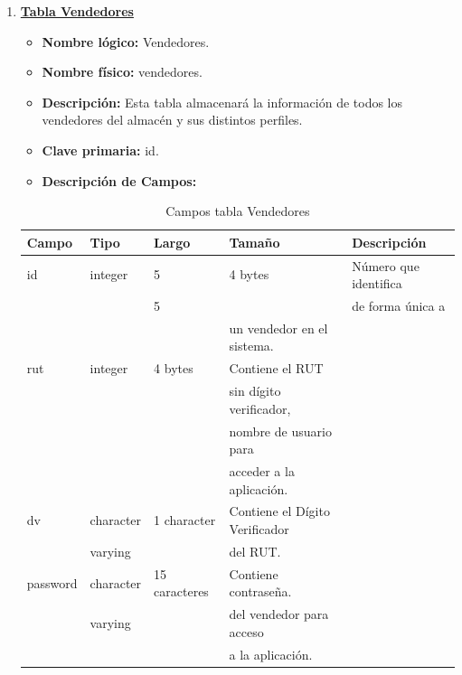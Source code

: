 \documentclass[letterpaper,12pt]{article}
\begin{document}
\begin{enumerate}
\item \textbf{\underline{Tabla Vendedores}}
\begin{itemize}
\item \textbf{Nombre lógico:} Vendedores.
\item \textbf{Nombre físico:} vendedores.
\item \textbf{Descripción:} Esta tabla almacenará la información de todos los vendedores del almacén y sus distintos perfiles.
\item \textbf{Clave primaria:} id.
\item \textbf{Descripción de Campos:}
\end{itemize}

\begin{table}[!ht]
\caption{Campos tabla Vendedores}
\begin{center}
\begin{tabular}{|l|l|l|l|l|}
\hline
\textbf{Campo} & \textbf{Tipo} & \textbf{Largo} & \textbf{Tamaño} & \textbf{Descripción} \hspace*{1.5cm} \\
\hline
id & integer &5& 4 bytes& Número que identifica\\ 
\mbox{} & \mbox{} &5& & de forma única a\\
\mbox{} & \mbox{} & & un vendedor en el sistema.\\
\hline
rut & integer & 4 bytes & Contiene el RUT\\
\mbox{} & \mbox{} & & sin dígito verificador,\\
\mbox{} & \mbox{} & & nombre de usuario para\\
\mbox{} & \mbox{} & & acceder a la aplicación.\\
\hline
dv & character & 1 character& Contiene el Dígito Verificador\\
\mbox{} & varying & & del RUT.\\
\hline
password & character & 15 caracteres & Contiene contraseña.\\
\mbox{} & varying & & del vendedor para acceso\\
\mbox{} & \mbox{} & & a la aplicación.\\
\hline

\end{tabular}
\end{center}
\end{table}



\end{enumerate}
\end{document}
